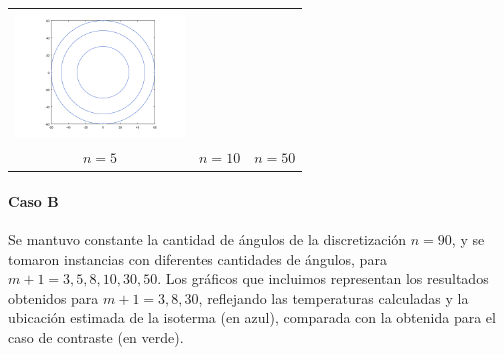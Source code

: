 {\begin{tabular}{ccc}
      \includegraphics[width=4.5cm]{graficos/1/1a-50-iso.png} \\
      {\small $n = 5$} &
      {\small $n = 10$} &
      {\small $n = 50$} \\
    \end{tabular}}

    \paragraph{Caso B} Se mantuvo constante la cantidad de ángulos de la discretización $n = 90$, y se tomaron instancias con diferentes cantidades de ángulos, para $m + 1 = 3, 5, 8, 10, 30, 50$. Los gráficos que incluimos representan los resultados obtenidos para $m + 1 = 3, 8, 30$, reflejando las temperaturas calculadas y la ubicación estimada de la isoterma (en azul), comparada con la obtenida para el caso de contraste (en verde).

